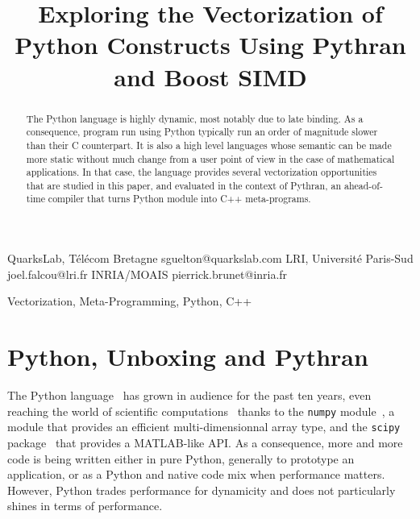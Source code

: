 \documentclass[preprint]{sigplanconf}
\begin{document}
\setlength{\pdfpageheight}{\paperheight}
\setlength{\pdfpagewidth}{\paperwidth}


\title{Exploring the Vectorization of Python Constructs Using Pythran and Boost SIMD}

           {QuarksLab, T{\'e}l{\'e}com Bretagne}
           {sguelton@quarkslab.com}
           {LRI, Universit\'e Paris-Sud}
           {joel.falcou@lri.fr}
           {INRIA/MOAIS}
           {pierrick.brunet@inria.fr}

\maketitle

\begin{abstract}

    The Python language is highly dynamic, most notably due to late binding. As
    a consequence, program run using Python typically run an order of magnitude
    slower than their C counterpart. It is also a high level languages whose
    semantic can be made more static without much change from a user point of
    view in the case of mathematical applications. In that case, the language
    provides several vectorization opportunities that are studied in this
    paper, and evaluated in the context of Pythran, an ahead-of-time compiler
    that turns Python module into C++ meta-programs.

\end{abstract}



\keywords
Vectorization, Meta-Programming, Python, C++


\section{Python, Unboxing and Pythran}

The Python language~\cite{rossum97} has grown in audience for the past ten
years, even reaching the world of scientific computations~\cite{oliphant2007}
thanks to the \texttt{numpy} module~\cite{numpyarray2011}, a module that
provides an efficient multi-dimensionnal array type, and the \texttt{scipy}
package~\cite{scipy} that provides a MATLAB-like API. As a consequence, more
and more code is being written either in pure Python, generally to prototype an
application, or as a Python and native code mix when performance matters.
However, Python trades performance for dynamicity and does not particularly
shines in terms of performance.
\end{document}
